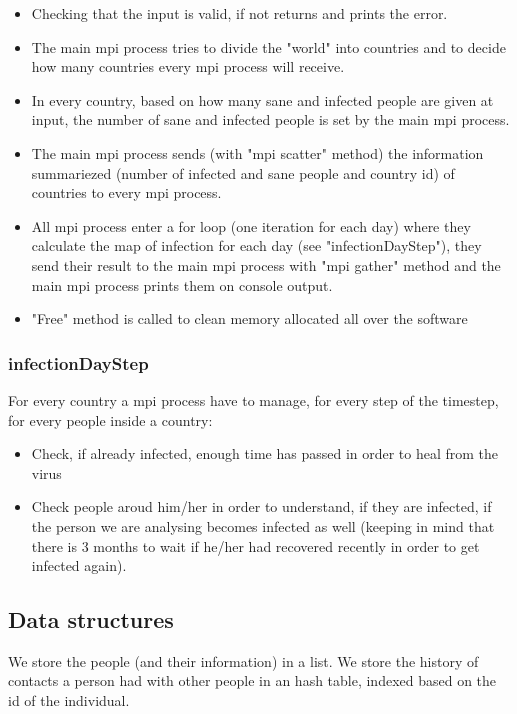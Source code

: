 \documentclass[table, 12pt]{article}
\begin{document}
\begin{itemize}
\setlength\itemsep{-0.5em}
\item Checking that the input is valid, if not returns and prints the error.
\item The main mpi process tries to divide the "world" into countries and to decide how many countries every mpi process will receive.
\item In every country, based on how many sane and infected people are given at input, the number of sane and infected people is set by the main mpi process.
\item The main mpi process sends (with "mpi scatter" method) the information summariezed (number of infected and sane people and country id) of countries to every mpi process.
\item All mpi process enter a for loop (one iteration for each day) where they calculate the map of infection for each day (see "infectionDayStep"), they send their result to the main mpi process with "mpi gather" method and the main mpi process prints them on console output.
\item "Free" method is called to clean memory allocated all over the software
\end{itemize}

\subsubsection{infectionDayStep}

For every country a mpi process have to manage, for every step of the timestep, for every people inside a country:

\begin{itemize}
\setlength\itemsep{-0.5em}
\item Check, if already infected, enough time has passed in order to heal from the virus
\item Check people aroud him/her in order to understand, if they are infected, if the person we are analysing becomes infected as well (keeping in mind that there is 3 months to wait if he/her had recovered recently in order to get infected again).
\end{itemize}

\subsection{Data structures}
We store the people (and their information) in a list.
We store the history of contacts a person had with other people in an hash table, indexed based on the id of the individual.
\end{document}
